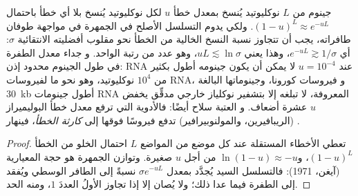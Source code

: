 \begin{proposition}\label{prop:b3:virology:error-threshold}
جينوم من $L$ نوكليوتيد يُنسخ بمعدل خطأ $u$ لكل نوكليوتيد
يُنسخ بلا أي خطأ باحتمال $(1-u)^{L} \approx e^{-uL}$.
ولكي يدوم التسلسل الأصلح في الجمهرة في مواجهة
طوفان طافراته، يجب أن تتجاوز نسبة النسخ الخالية من الخطأ
نحو مقلوب أفضليته الانتقائية $\sigma$: أي $e^{-uL} \gtrsim
1/\sigma$، وهذا يعني $uL \lesssim \ln\sigma$، وهو عدد من رتبة الواحد. و
جداء معدل الطفرة في طول الجينوم محدود إذن: 
RNA عند $u = 10^{-4}$ لا يمكن أن يكون جينومه أطول بكثير من
$10^{4}$ نوكليوتيد، وهو نحو ما لفيروسات RNA، و
فيروسات كورونا، وجينوماتها البالغة \qty{30}{kb} أطول جينومات RNA المعروفة، لا تبلغه
إلا بتشفير نوكلياز خارجي مدقِّق يخفض $u$ عشرة أضعاف. و
العتبة سلاح أيضًا: فالأدوية التي ترفع معدل خطأ البوليميراز
(الريبافيرين، والمولنوبيرافير) تدفع فيروسًا فوقها إلى \emph{كارثة
الخطأ}، فينهار .
\end{proposition}
\begin{proof}
تعطي الأخطاء المستقلة عند كل موضع من المواضع $L$ احتمال الخلو من الخطأ
$(1-u)^{L}$، و$\ln(1-u) \approx -u$ من أجل $u$ صغيرة. وتوازن
الجمهرة هو حجة  المعيارية (آيغن، 1971): فالتسلسل
السيد يُجدَّد بمعدل $\sigma e^{-uL}$ نسبةً إلى الطافر
الوسطي ويُفقد إلى الطفرة فيما عدا ذلك؛ ولا يُصان إلا إذا تجاوز
الأولُ العددَ $1$، ومنه الحد.
\end{proof}

